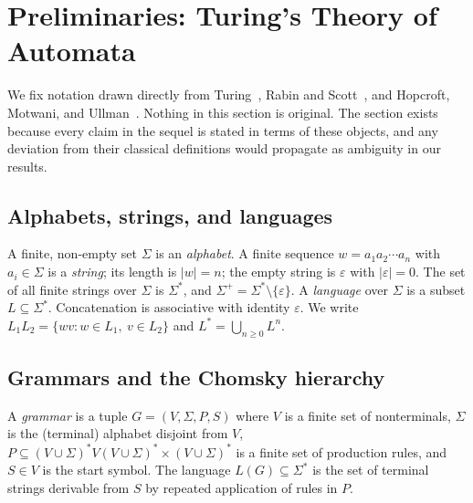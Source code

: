 \section{Preliminaries: Turing's Theory of Automata}
\label{sec:preliminaries}

We fix notation drawn directly from
Turing~\cite{turing1936computable},
Rabin and Scott~\cite{rabin1959finite},
and Hopcroft, Motwani, and Ullman~\cite{hopcroft2006automata}.
Nothing in this section is original.  The section exists because
every claim in the sequel is stated in terms of these objects, and
any deviation from their classical definitions would propagate as
ambiguity in our results.

\subsection{Alphabets, strings, and languages}

A finite, non-empty set $\Sigma$ is an \emph{alphabet}.  A finite
sequence $w = a_1 a_2 \cdots a_n$ with $a_i \in \Sigma$ is a
\emph{string}; its length is $|w| = n$; the empty string is
$\varepsilon$ with $|\varepsilon|=0$.  The set of all finite
strings over $\Sigma$ is $\Sigma^*$, and $\Sigma^+ = \Sigma^*
\setminus \{\varepsilon\}$.  A \emph{language} over $\Sigma$ is a
subset $L \subseteq \Sigma^*$.  Concatenation is associative with
identity $\varepsilon$.  We write $L_1 L_2 = \{wv : w\in L_1,
\ v\in L_2\}$ and $L^* = \bigcup_{n\ge 0} L^n$.

\subsection{Grammars and the Chomsky hierarchy}

A \emph{grammar} is a tuple $G = (V, \Sigma, P, S)$ where $V$ is a
finite set of nonterminals, $\Sigma$ is the (terminal) alphabet
disjoint from $V$, $P \subseteq (V \cup \Sigma)^* V (V \cup
\Sigma)^* \times (V \cup \Sigma)^*$ is a finite set of production
rules, and $S \in V$ is the start symbol.  The language $L(G)
\subseteq \Sigma^*$ is the set of terminal strings derivable from
$S$ by repeated application of rules in $P$.

